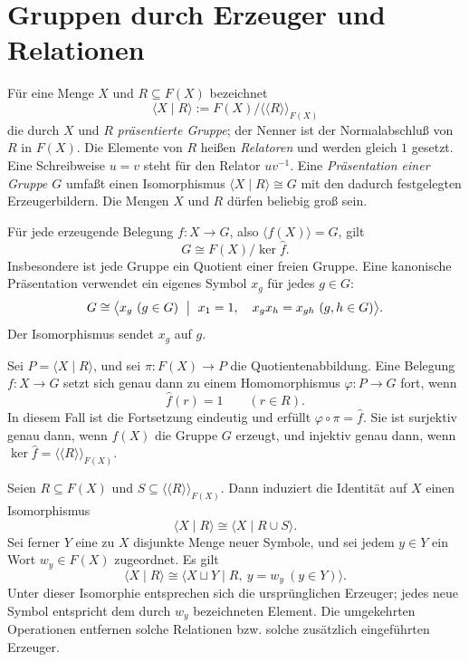 \section{Gruppen durch Erzeuger und Relationen}

\begin{definition}
\label{b40guide:def:presentation}
Für eine Menge \(X\) und \(R\subseteq F(X)\) bezeichnet
\[
 \langle X\mid R\rangle
 :=F(X)/\langle\!\langle R\rangle\!\rangle_{F(X)}
\]
die durch \(X\) und \(R\) \emph{präsentierte Gruppe}; der Nenner ist der
Normalabschluß von \(R\) in \(F(X)\).
Die Elemente von \(R\) heißen \emph{Relatoren} und werden gleich \(1\)
gesetzt. Eine Schreibweise \(u=v\) steht für den Relator \(uv^{-1}\).
Eine \emph{Präsentation einer Gruppe \(G\)} umfaßt einen Isomorphismus
\(\langle X\mid R\rangle\cong G\) mit den dadurch festgelegten
Erzeugerbildern. Die Mengen \(X\) und \(R\) dürfen beliebig groß sein.
\end{definition}

\begin{theorem}
\label{b40guide:thm:every-group-presentation}
Für jede erzeugende Belegung \(f:X\to G\), also
\(\langle f(X)\rangle=G\), gilt
\[
 G\cong F(X)/\ker\widehat f.
\]
Insbesondere ist jede Gruppe ein Quotient einer freien Gruppe.
Eine kanonische Präsentation verwendet ein eigenes Symbol \(x_g\)
für jedes \(g\in G\):
\[
 G\cong
 \bigl\langle x_g\ (g\in G)\ \bigm|\
 x_1=1,\quad x_gx_h=x_{gh}\ (g,h\in G)\bigr\rangle.
\]
Der Isomorphismus sendet \(x_g\) auf \(g\). \cite{milne}
\end{theorem}

\begin{theorem}
\label{b40guide:thm:presentation-mapping}
Sei \(P=\langle X\mid R\rangle\), und sei \(\pi:F(X)\to P\)
die Quotientenabbildung. Eine Belegung \(f:X\to G\) setzt sich genau
dann zu einem Homomorphismus \(\varphi:P\to G\) fort, wenn
\[
 \widehat f(r)=1\qquad(r\in R).
\]
In diesem Fall ist die Fortsetzung eindeutig und erfüllt
\(\varphi\circ\pi=\widehat f\).
Sie ist surjektiv genau dann, wenn \(f(X)\) die Gruppe \(G\) erzeugt,
und injektiv genau dann, wenn
\(\ker\widehat f=\langle\!\langle R\rangle\!\rangle_{F(X)}\).
\cite{milne}
\end{theorem}

\begin{theorem}
\label{b40guide:thm:presentation-changes}
Seien \(R\subseteq F(X)\) und
\(S\subseteq\langle\!\langle R\rangle\!\rangle_{F(X)}\).
Dann induziert die Identität auf \(X\) einen Isomorphismus
\[
 \langle X\mid R\rangle\cong\langle X\mid R\cup S\rangle.
\]
Sei ferner \(Y\) eine zu \(X\) disjunkte Menge neuer Symbole,
und sei jedem \(y\in Y\) ein Wort \(w_y\in F(X)\) zugeordnet.
Es gilt
\[
 \langle X\mid R\rangle
 \cong
 \bigl\langle X\sqcup Y\mid R,\ y=w_y\ (y\in Y)\bigr\rangle.
\]
Unter dieser Isomorphie entsprechen sich die ursprünglichen Erzeuger;
jedes neue Symbol entspricht dem durch \(w_y\) bezeichneten Element.
Die umgekehrten Operationen entfernen solche Relationen bzw. solche
zusätzlich eingeführten Erzeuger. \cite{milne}
\end{theorem}

